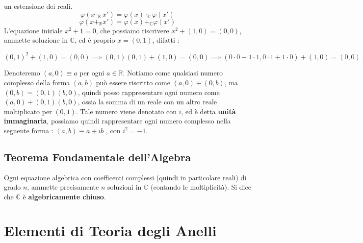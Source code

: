 \documentclass[12pt, letterpaper]{article}
\begin{document}
un estensione dei reali.\begin{equation}
    \varphi(x\cdot_{\mathbb{R}} x')=\varphi(x)\cdot_{\mathbb{C}}\varphi(x')
\end{equation}\begin{equation}
    \varphi(x+_{\mathbb{R}} x')=\varphi(x)+_{\mathbb{C}} \varphi(x')
\end{equation}
L'equazione iniziale \(x^2+1=0\), che possiamo riscrivere \(x^2+(1,0)=(0,0)\), ammette soluzione in \(\mathbb{C}\),
ed è proprio \(x=(0,1)\), difatti : 
\begin{center}
    \(
        (0,1)^2+(1,0)=(0,0)\implies(0,1)(0,1)+(1,0)=(0,0)\implies(0\cdot 0 - 1\cdot 1,0\cdot 1 + 1\cdot 0)+(1,0)=(0,0)
        \implies(-1,0)+(1,0)=(0,0)\implies (-1+1,0)=(0,0)\implies (0,0)=(0,0) \checkmark
    \)
\end{center}
Denoteremo \((a,0)\equiv a\) per ogni \(a\in \mathbb{R}\). Notiamo come qualsiasi numero complesso della forma 
\((a,b)\) può essere riscritto come \((a,0)+(0,b)\), ma \((0,b)=(0,1)(b,0)\), quindi posso rappresentare ogni numero 
come \((a,0)+(0,1)(b,0)\), ossia la somma di un reale con un altro reale moltiplicato per \((0,1)\). Tale numero viene 
denotato con \(i\), ed è detta \textbf{unità immaginaria}, possiamo quindi rappresentare ogni numero complesso nella seguente 
forma : \((a,b)\equiv a+ib\) , con \(i^2=-1\).
\subsection{Teorema Fondamentale dell'Algebra}\label{tfalgebra}
Ogni equazione algebrica con coefficenti complessi (quindi in particolare reali) di grado \(n\), ammette 
precisamente \(n\) soluzioni in \(\mathbb{C}\) (contando le moltiplicità). Si dice che \(\mathbb{C}\) è 
\textbf{algebricamente chiuso}.
\section{Elementi di Teoria degli Anelli}\label{TeoriaAnelli}
\end{document}
